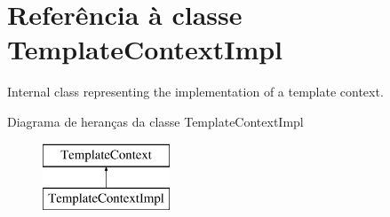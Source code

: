 \hypertarget{class_template_context_impl}{\section{Referência à classe Template\-Context\-Impl}
\label{class_template_context_impl}
}


Internal class representing the implementation of a template context.  


Diagrama de heranças da classe Template\-Context\-Impl\begin{figure}[H]
\begin{center}
\leavevmode
\includegraphics[height=2.000000cm]{class_template_context_impl}
\end{center}
\end{figure}
